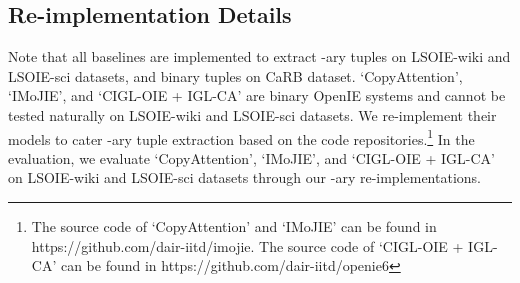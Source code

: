 \documentclass[11pt]{article}
\begin{document}
\subsection{Re-implementation Details}
\label{sec:reimplementation}
Note that all baselines are implemented to extract -ary tuples on LSOIE-wiki and LSOIE-sci datasets, and binary tuples on CaRB dataset. `CopyAttention', `IMoJIE', and `CIGL-OIE + IGL-CA' are binary OpenIE systems and cannot be tested naturally on LSOIE-wiki and LSOIE-sci datasets. We re-implement their models to cater -ary tuple extraction based on the code repositories.\footnote{The source code of `CopyAttention' and `IMoJIE' can be found in https://github.com/dair-iitd/imojie. The source code of `CIGL-OIE + IGL-CA' can be found in https://github.com/dair-iitd/openie6}
In the evaluation, we evaluate `CopyAttention', `IMoJIE', and `CIGL-OIE + IGL-CA' on LSOIE-wiki and LSOIE-sci datasets through our -ary re-implementations.











 
\end{document}

